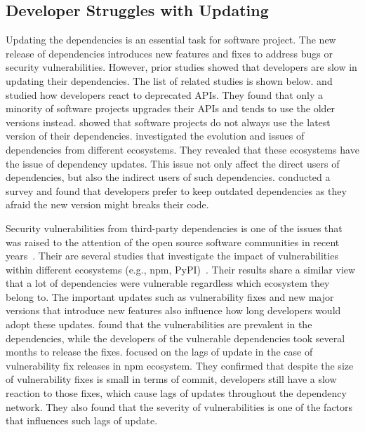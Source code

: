 \documentclass[conference]{IEEEtran}
\newcommand{\boxedtext}[1]{\fbox{\scriptsize\bfseries\textsf{#1}}}
\newcommand{\nota}[2]{
	\boxedtext{#1}
	{\small$\blacktriangleright$\emph{\textsl{#2}}$\blacktriangleleft$}
}
\newcommand{\todo}[1]{{\color{red}\nota{TODO}{#1}}}
\begin{document}
	\subsection{Developer Struggles with Updating}
	Updating the dependencies is an essential task for software project.
	The new release of dependencies introduces new features and fixes to address bugs or security vulnerabilities.
    However, prior studies showed that developers are slow in updating their dependencies.
    The list of related studies is shown below.
	\citet{Robbes:2012} and \citet{Sawant2016} studied how developers react to deprecated APIs.
	They found that only a minority of software projects upgrades their APIs and tends to use the older versions instead.
	\citet{Ihara:2017} showed that software projects do not always use the latest version of their dependencies.
	\citet{Decan:2017} investigated the evolution and issues of dependencies from different ecosystems.
	They revealed that these ecosystems have the issue of dependency updates.
	This issue not only affect the direct users of dependencies, but also the indirect users of such dependencies.
	\citet{Bogart:2015} conducted a survey and found that developers prefer to keep outdated dependencies as they afraid the new version might breaks their code.
	
	Security vulnerabilities from third-party dependencies is one of the issues that was raised to the attention of the open source software communities in recent years~\citep{Web:octoverse}.
	Their are several studies that investigate the impact of vulnerabilities within different ecosystems (e.g., npm, PyPI)~\citep{Kikas:2017, Linares:2017, Lauinger2016ThouSN, Decan:2018}.
	Their results share a similar view that a lot of dependencies were vulnerable regardless which ecosystem they belong to.
	The important updates such as vulnerability fixes and new major versions that introduce new features also influence how long developers would adopt these updates.
	\citet{Decan:2018} found that the vulnerabilities are prevalent in the dependencies, while the developers of the vulnerable dependencies took several months to release the fixes.
	\citet{Chinthanet2021} focused on the lags of update in the case of vulnerability fix releases in npm ecosystem.
	They confirmed that despite the size of vulnerability fixes is small in terms of commit, developers still have a slow reaction to those fixes, which cause lags of updates throughout the dependency network.
	They also found that the severity of vulnerabilities is one of the factors that influences such lags of update.
	
\end{document}
